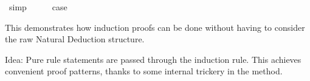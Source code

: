 \begin{isabellebody}
\ simp\isanewline
\ \ \isamarkupfalse%
\ \isamarkupfalse%
\ {}case\ \isamarkupfalse%
\isanewline
{}\isamarkupfalse%
%
\endisatagproof
{\isafoldproof}%
%
\isadelimproof
%
\endisadelimproof
%
\begin{isamarkuptext}%
This demonstrates how induction proofs can be done without
  having to consider the raw Natural Deduction structure.%
\end{isamarkuptext}%
\isamarkuptrue%
%
\isamarkuptrue%
%
\begin{isamarkuptext}%
Idea: Pure rule statements are passed through the induction
  rule.  This achieves convenient proof patterns, thanks to some
  internal trickery in the \hyperlink{method.induct}{\mbox{}} method.


\end{isamarkuptext}
\end{isabellebody}
